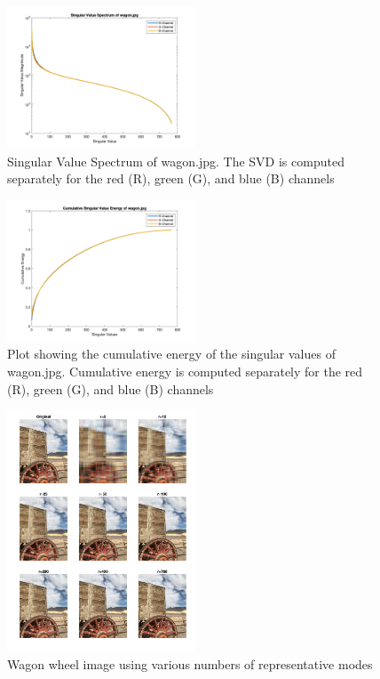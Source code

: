 \documentclass[conference]{IEEEtran}
\begin{document}
	 \begin{figure}[t]
        \includegraphics[width=0.5\textwidth]{svals_wagon_rgb}
        \caption{Singular Value Spectrum of wagon.jpg. The SVD is computed separately for the red (R), green (G), and blue (B) channels}
        \label{fig:svalplot}
    \end{figure}
    
	\begin{figure}[t]
        \includegraphics[width=0.5\textwidth]{sv_energy_wagon_rgb}
        \caption{Plot showing the cumulative energy of the singular values of wagon.jpg. Cumulative energy is computed separately for the red (R), green (G), and blue (B) channels}
        \label{fig:svalenergyplot}
    \end{figure}
    
    \begin{figure}[t]
        \includegraphics[width=0.5\textwidth]{show_different_r_wagon}
        \caption{Wagon wheel image using various numbers of representative modes}
        \label{fig:showwagondiffr}
    \end{figure}
    
\end{document}
